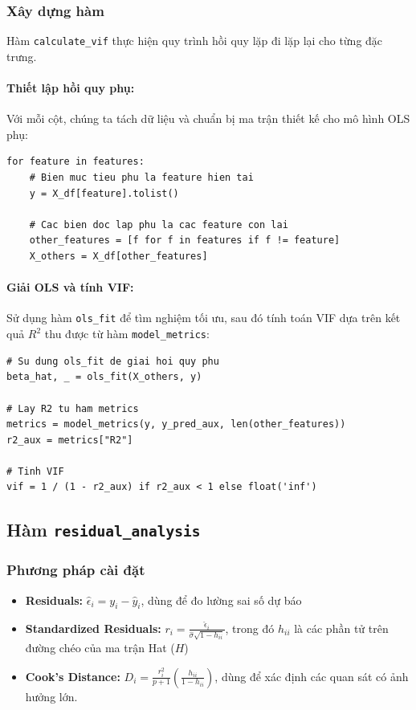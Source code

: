 \subsubsection{Xây dựng hàm}
Hàm \texttt{calculate\_vif} thực hiện quy trình hồi quy lặp đi lặp lại cho từng đặc trưng.

\paragraph{Thiết lập hồi quy phụ:}
Với mỗi cột, chúng ta tách dữ liệu và chuẩn bị ma trận thiết kế cho mô hình OLS phụ:
\newpage
\begin{lstlisting}[style=Python, caption=Chuẩn bị dữ liệu cho hồi quy phụ]
for feature in features:
    # Bien muc tieu phu la feature hien tai
    y = X_df[feature].tolist()
    
    # Cac bien doc lap phu la cac feature con lai
    other_features = [f for f in features if f != feature]
    X_others = X_df[other_features]
\end{lstlisting}

\paragraph{Giải OLS và tính VIF:}
Sử dụng hàm \texttt{ols\_fit} để tìm nghiệm tối ưu, sau đó tính toán VIF dựa trên kết quả $R^2$ thu được từ hàm \texttt{model\_metrics}:
\begin{lstlisting}[style=Python, caption=Tính toán VIF từ nghiệm đóng]
# Su dung ols_fit de giai hoi quy phu
beta_hat, _ = ols_fit(X_others, y)

# Lay R2 tu ham metrics
metrics = model_metrics(y, y_pred_aux, len(other_features))
r2_aux = metrics["R2"]

# Tinh VIF
vif = 1 / (1 - r2_aux) if r2_aux < 1 else float('inf')
\end{lstlisting}


\subsection{Hàm \texttt{residual\_analysis}}

\subsubsection{Phương pháp cài đặt}
\begin{itemize}
    \item \textbf{Residuals:} $\hat{\epsilon}_i = y_i - \hat{y}_i$, dùng để đo lường sai số dự báo
    \item \textbf{Standardized Residuals:} $r_i = \frac{\hat{\epsilon}_i}{\hat{\sigma}\sqrt{1-h_{ii}}}$, trong đó $h_{ii}$ là các phần tử trên đường chéo của ma trận Hat ($H$)
    \item \textbf{Cook's Distance:} $D_i = \frac{r_i^2}{p+1} \left( \frac{h_{ii}}{1-h_{ii}} \right)$, dùng để xác định các quan sát có ảnh hưởng lớn.
\end{itemize}

